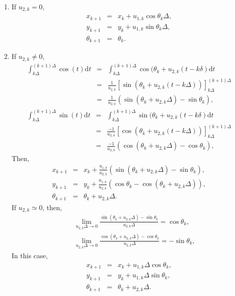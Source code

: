 \documentclass[11pt,a4paper]{jsarticle}
\begin{document}
\begin{enumerate}
\item If $u_{2,k}=0$,
	\begin{eqnarray}
	x_{k+1}&=&x_{k}+u_{1,k}\cos\theta_{k}\Delta,\\
	y_{k+1}&=&y_{k}+u_{1,k}\sin\theta_{k}\Delta,\\
	\theta_{k+1}&=&\theta_{k}.
	\end{eqnarray}
\item If $u_{2,k}\neq0$,
	\begin{eqnarray}
	\int_{k\Delta}^{(k+1)\Delta}\cos(t)\text{d}t&=&\int_{k\Delta}^{(k+1)\Delta}\cos(\theta_{k}+u_{2,k}(t-k\delta)\text{d}t\nonumber\\
	&=&\frac{1}{u_{2,k}}\left[\sin(\theta_{k}+u_{2,k}(t-k\Delta))\right]_{k\Delta}^{(k+1)\Delta}\nonumber\\
	&=&\frac{1}{u_{2,k}}(\sin(\theta_{k}+u_{2,k}\Delta)-\sin\theta_{k}),\nonumber
	\end{eqnarray}
	\begin{eqnarray}
	\int_{k\Delta}^{(k+1)\Delta}\sin(t)\text{d}t&=&\int_{k\Delta}^{(k+1)\Delta}\sin(\theta_{k}+u_{2,k}(t-k\delta)\text{d}t\nonumber\\
	&=&\frac{-1}{u_{2,k}}\left[\cos(\theta_{k}+u_{2,k}(t-k\Delta))\right]_{k\Delta}^{(k+1)\Delta}\nonumber\\
	&=&\frac{-1}{u_{2,k}}(\cos(\theta_{k}+u_{2,k}\Delta)-\cos\theta_{k}),\nonumber
	\end{eqnarray}
	Then, 
	\begin{eqnarray}
	x_{k+1}&=&x_{k}+\frac{u_{1,k}}{u_{2,k}}(\sin(\theta_{k}+u_{2,k}\Delta)-\sin\theta_{k}),\\
	y_{k+1}&=&y_{k}+\frac{u_{1,k}}{u_{2,k}}(\cos\theta_{k}-\cos(\theta_{k}+u_{2,k}\Delta)),\\
	\theta_{k+1}&=&\theta_{k}+u_{2,k}\Delta.
	\end{eqnarray}
	If $u_{2,k}\simeq0$, then, 
	\begin{eqnarray}
	&&\lim_{u_{2,k}\Delta\to0}\frac{\sin(\theta_{k}+u_{2,k}\Delta)-\sin\theta_{k}}{u_{2,k}\Delta}=\cos\theta_{k},\nonumber\\
	&&\lim_{u_{2,k}\Delta\to0}\frac{\cos(\theta_{k}+u_{2,k}\Delta)-\cos\theta_{k}}{u_{2,k}\Delta}=-\sin\theta_{k},\nonumber
	\end{eqnarray}
	In this case, 
	\begin{eqnarray}
	x_{k+1}&=&x_{k}+u_{1,k}\Delta\cos\theta_{k},\\
	y_{k+1}&=&y_{k}+u_{1,k}\Delta\sin\theta_{k},\\
	\theta_{k+1}&=&\theta_{k}+u_{2,k}\Delta.
	\end{eqnarray}
\end{enumerate}
\end{document}
